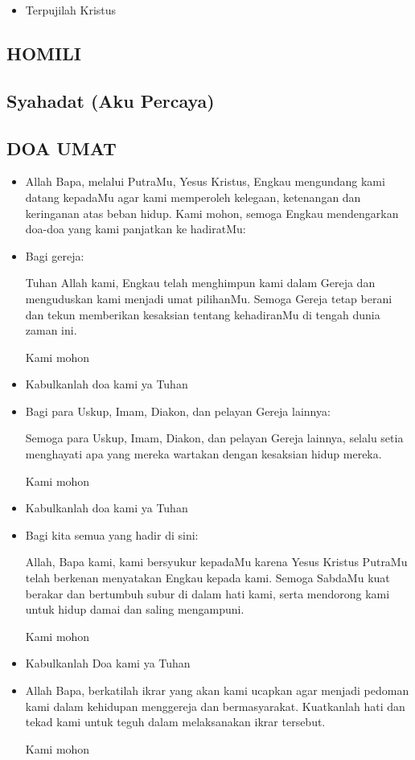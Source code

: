 \documentclass[a5paper,headsepline,titlepage,11pt,nnormalheadings]{scrbook}
\newcommand{\BU}[1]{\begin{itemize} \item[U:] #1 \end{itemize}}
\newcommand{\BI}[1]{\begin{itemize} \item[I:] #1 \end{itemize}}
\newcommand{\BP}[1]{\begin{itemize} \item[P:] #1 \end{itemize}}
\begin{document}
\BU{Terpujilah Kristus}

\subsection*{HOMILI}

\subsection*{Syahadat (Aku Percaya)}

\subsection*{DOA UMAT}

\BI{Allah Bapa, melalui PutraMu, Yesus Kristus, Engkau mengundang kami datang kepadaMu agar kami memperoleh kelegaan, ketenangan dan keringanan atas beban hidup. Kami mohon, semoga Engkau mendengarkan doa-doa yang kami panjatkan ke hadiratMu:}

\BP{Bagi gereja:

Tuhan Allah kami, Engkau telah menghimpun kami dalam Gereja dan menguduskan kami menjadi umat pilihanMu. Semoga Gereja tetap berani dan tekun memberikan kesaksian tentang kehadiranMu di tengah dunia zaman ini.

Kami mohon}

\BU{Kabulkanlah doa kami ya Tuhan}

\BP{Bagi para Uskup, Imam, Diakon, dan pelayan Gereja lainnya:

Semoga para Uskup, Imam, Diakon, dan pelayan Gereja lainnya, selalu setia menghayati apa yang mereka wartakan dengan kesaksian hidup mereka.

Kami mohon}

\BU{Kabulkanlah doa kami ya Tuhan}

\BP{Bagi kita semua yang hadir di sini:

Allah, Bapa kami, kami bersyukur kepadaMu karena Yesus Kristus PutraMu telah berkenan menyatakan Engkau kepada kami. Semoga SabdaMu kuat berakar dan bertumbuh subur di dalam hati kami, serta mendorong kami untuk hidup damai dan saling mengampuni.

Kami mohon}

\BU{Kabulkanlah Doa kami ya Tuhan} 

\BP{Allah Bapa, berkatilah ikrar yang akan kami ucapkan agar menjadi pedoman kami dalam kehidupan menggereja dan bermasyarakat. Kuatkanlah hati dan tekad kami untuk teguh dalam melaksanakan ikrar tersebut.

Kami mohon}
\end{document}
